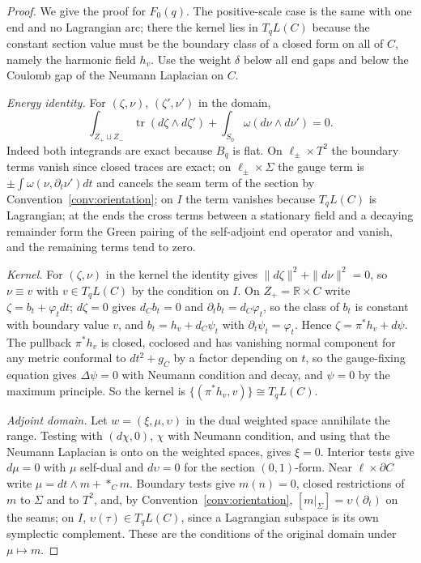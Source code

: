 \documentclass[11pt]{amsart}
\theoremstyle{definition}
\theoremstyle{remark}
\theoremstyle{plain}
\numberwithin{equation}{section}
\newcommand{\RR}{\mathbb{R}}
\newcommand{\tr}{\operatorname{tr}}
\begin{document}
\begin{proof}
We give the proof for $F_0(q)$. The positive-scale case is the same with one
end and no Lagrangian arc; there the kernel lies in $T_qL(C)$ because the
constant section value must be the boundary class of a closed form on all of
$C$, namely the harmonic field $h_v$. Use the weight $\delta$ below all end gaps
and below the Coulomb gap of the Neumann Laplacian on $C$.

\emph{Energy identity.} For $(\zeta,\nu)$, $(\zeta',\nu')$ in the domain,
\[
\int_{Z_+\sqcup Z_-}\tr(d\zeta\wedge d\zeta')+\int_{S_0}\omega(d\nu\wedge d\nu')=0 .
\]
Indeed both integrands are exact because $B_q$ is flat. On
$\ell_\pm\times T^2$ the boundary terms vanish since closed traces are
exact; on $\ell_\pm\times\Sigma$ the gauge term is
$\pm\int\omega(\nu,\partial_t\nu')dt$ and cancels the seam term of the
section by Convention~\ref{conv:orientation}; on $I$ the term vanishes
because $T_qL(C)$ is Lagrangian; at the ends the cross terms between a stationary field and a decaying remainder form the Green pairing of the
self-adjoint end operator and vanish, and the remaining terms tend to
zero.

\emph{Kernel.} For $(\zeta,\nu)$ in the kernel the identity gives
$\|d\zeta\|^2+\|d\nu\|^2=0$, so $\nu\equiv v$ with $v\in T_qL(C)$ by the
condition on $I$. On $Z_+=\RR\times C$ write $\zeta=b_t+\varphi_tdt$;
$d\zeta=0$ gives $d_Cb_t=0$ and $\partial_tb_t=d_C\varphi_t$, so the class of
$b_t$ is constant with boundary value $v$, and $b_t=h_v+d_C\psi_t$ with
$\partial_t\psi_t=\varphi_t$. Hence $\zeta=\pi^*h_v+d\psi$. The pullback
$\pi^*h_v$ is closed, coclosed and has vanishing normal component for any
metric conformal to $dt^2+g_C$ by a factor depending on $t$, so the gauge-fixing equation gives $\Delta\psi=0$ with Neumann condition and decay, and $\psi=0$ by
the maximum principle. So the kernel is $\{(\pi^*h_v,v)\}\cong T_qL(C)$.

\emph{Adjoint domain.} Let $w=(\xi,\mu,\upsilon)$ in the dual weighted space
annihilate the range. Testing with $(d\chi,0)$, $\chi$ with Neumann
condition, and using that the Neumann Laplacian is onto on the weighted
spaces, gives $\xi=0$. Interior tests give $d\mu=0$ with $\mu$ self-dual
and $d\upsilon=0$ for the section $(0,1)$-form. Near $\ell\times\partial C$ write
$\mu=dt\wedge m+*_Cm$. Boundary tests give $m(n)=0$, closed restrictions
of $m$ to $\Sigma$ and to $T^2$, and, by Convention~\ref{conv:orientation},
$[m|_\Sigma]=\upsilon(\partial_t)$ on the seams; on $I$, $\upsilon(\tau)\in T_qL(C)$,
since a Lagrangian subspace is its own symplectic complement. These are
the conditions of the original domain under $\mu\mapsto m$.


\end{proof}
\end{document}
